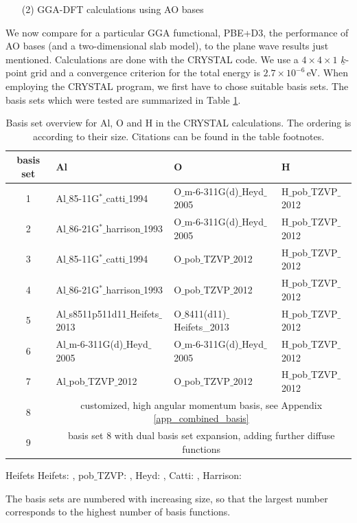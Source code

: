 \documentclass[11pt,DIV=13,BCOR=5mm,a4paper,headinclude]{scrbook}
\renewcommand{\vec}[1]{\underline{#1}}
\begin{document}
\begin{enumerate}
 \item[(2)] GGA-DFT calculations using AO bases
\end{enumerate}
We now compare for a particular GGA fumctional, PBE+D3, the performance of AO bases (and a two-dimensional slab model), to the plane wave results just mentioned.
Calculations are done with the CRYSTAL code.
We use a $4\times 4 \times 1$ $\vec{k}$-point grid and a convergence criterion for the total energy is $2.7\times 10^{-6}\,$eV.
When employing the CRYSTAL program, we first have to chose suitable basis sets.
The basis sets which were tested are summarized in Table \ref{tab:basissets}.
\begin{table}[!h]
  \centering
   \caption{Basis set overview for Al, O and H in the CRYSTAL calculations.
   The ordering is according to their size.
   Citations can be found in the table footnotes.}
  \begin{tabular}{c|lll}
  \toprule
  basis set & Al & O & H \\\midrule
   1&Al$\_$85-11G$^\ast\_$catti$\_$1994 &O$\_$m-6-311G(d)$\_$Heyd$\_$2005 & H$\_$pob$\_$TZVP$\_$2012\\
   2&Al$\_$86-21G$^\ast\_$harrison$\_$1993 &O$\_$m-6-311G(d)$\_$Heyd$\_$2005 & H$\_$pob$\_$TZVP$\_$2012\\
   3&Al$\_$85-11G$^\ast\_$catti$\_$1994 &O$\_$pob$\_$TZVP$\_$2012 & H$\_$pob$\_$TZVP$\_$2012\\
   4&Al$\_$86-21G$^\ast\_$harrison$\_$1993 &O$\_$pob$\_$TZVP$\_$2012 & H$\_$pob$\_$TZVP$\_$2012\\
   5&Al$\_$s8511p511d11$\_$Heifets$\_$2013 & O$\_$8411(d11)$\_$Heifets\_2013&H$\_$pob$\_$TZVP$\_$2012 \\
   6&Al$\_$m-6-311G(d)$\_$Heyd$\_$2005 &O$\_$m-6-311G(d)$\_$Heyd$\_$2005 & H$\_$pob$\_$TZVP$\_$2012\\
   7&Al$\_$pob$\_$TZVP$\_$2012 &O$\_$pob$\_$TZVP$\_$2012 & H$\_$pob$\_$TZVP$\_$2012\\
   8&\multicolumn{3}{c}{customized, high angular momentum basis, see Appendix \ref{app_combined_basis}} \\
   9&\multicolumn{3}{c}{basis set 8 with dual basis set expansion, adding further diffuse functions}\\\bottomrule
  \end{tabular}
  \begin{tablenotes}
 \footnotesize
\item[Heifets] Heifets: \cite{heifets}, pob$\_$TZVP: \cite{pobTZVP}, Heyd: \cite{heyd1,heyd2}, Catti: \cite{catti}, Harrison: \cite{harrison1,harrison2}
\end{tablenotes}
  \label{tab:basissets}
\end{table}
The basis sets are numbered with increasing size, so that the largest number corresponds to the highest number of basis functions.
\end{document}
